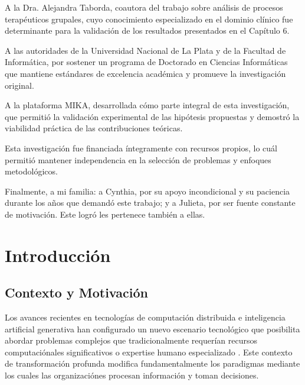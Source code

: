\documentclass[12pt,a4paper,twoside]{book}
\begin{document}
A la Dra. Alejandra Taborda, coautora del trabajo sobre análisis de procesos terapéuticos grupales, cuyo conocimiento especializado en el dominio clínico fue determinante para la validación de los resultados presentados en el Capítulo 6.

A las autoridades de la Universidad Nacional de La Plata y de la Facultad de Informática, por sostener un programa de Doctorado en Ciencias Informáticas que mantiene estándares de excelencia académica y promueve la investigación original.

A la plataforma MIKA, desarrollada cómo parte integral de esta investigación, que permitió la validación experimental de las hipótesis propuestas y demostró la viabilidad práctica de las contribuciones teóricas.

Esta investigación fue financiada íntegramente con recursos propios, lo cuál permitió mantener independencia en la selección de problemas y enfoques metodológicos.

Finalmente, a mi familia: a Cynthia, por su apoyo incondicional y su paciencia durante los años que demandó este trabajo; y a Julieta, por ser fuente constante de motivación. Este logró les pertenece también a ellas.

\tableofcontents
\listoffigures
\listoftables

\mainmatter
\chapter{Introducción}
\label{cap:introducción}

\section{Contexto y Motivación}

Los avances recientes en tecnologías de computación distribuida e inteligencia artificial generativa han configurado un nuevo escenario tecnológico que posibilita abordar problemas complejos que tradicionalmente requerían recursos computaciónales significativos o expertise humano especializado \cite{dean2008mapreduce, brown2020gpt3}. Este contexto de transformación profunda modifica fundamentalmente los paradigmas mediante los cuales las organizaciónes procesan información y toman decisiones.
\end{document}
